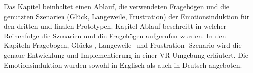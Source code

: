 

Das Kapitel beinhaltet einen Ablauf, die verwendeten Frageb{\"o}gen und die genutzten Szenarien (Gl{\"u}ck, Langeweile, Frustration) der Emotionsinduktion f{\"u}r den dritten und finalen Prototypen. 
Kapitel Ablauf beschreibt in welcher Reihenfolge die Szenarien und die Frageb{\"o}gen aufgerufen wurden. 
In den Kapiteln Fragebogen, Gl{\"u}cks-, Langeweile- und Frustration- Szenario wird  die genaue Entwicklung und Implementierung in einer VR-Umgebung erl{\"a}utert.
Die Emotionsinduktion wurden sowohl in Englisch als auch in Deutsch angeboten.







